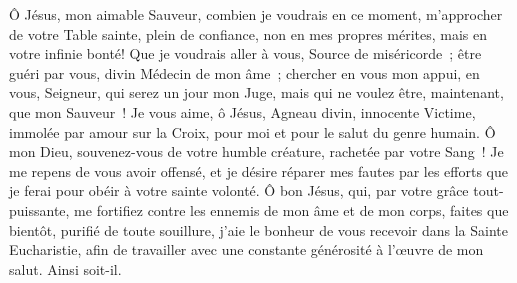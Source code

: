 













\vspace{3cm}

\begin{center}



\end{center}

\newpage
\fontsize{11.5}{13}\selectfont
\begin{center}\end{center}

Ô Jésus, mon aimable Sauveur, combien je voudrais en ce moment, m’approcher de votre Table sainte, plein de confiance, non en mes propres mérites, mais en votre infinie bonté! Que je voudrais aller à vous, Source de miséricorde~; être guéri par vous, divin Médecin de mon âme~; chercher en vous mon appui, en vous, Seigneur, qui serez un jour mon Juge, mais qui ne voulez être, maintenant, que mon Sauveur~! Je vous aime, ô Jésus, Agneau divin, innocente Victime, immolée par amour sur la Croix, pour moi et pour le salut du genre humain. Ô mon Dieu, souvenez-vous de votre humble créature, rachetée par votre Sang~! Je me repens de vous avoir offensé, et je désire réparer mes fautes par les efforts que je ferai pour obéir à votre sainte volonté. Ô bon Jésus, qui, par votre grâce tout-puissante, me fortifiez contre les ennemis de mon âme et de mon corps, faites que bientôt, purifié de toute souillure, j’aie le bonheur de vous recevoir dans la Sainte Eucharistie, afin de travailler avec une constante générosité à l’œuvre de mon salut. Ainsi soit-il.\par\vspace{0.2cm}
\begin{center}\end{center}

